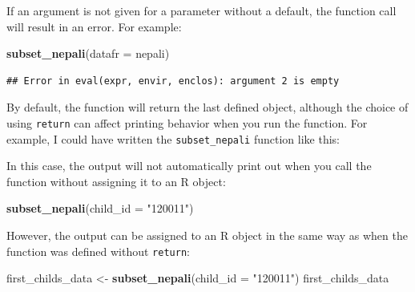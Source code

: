 \documentclass[]{book}
\makeatletter
\newenvironment{Shaded}{\begin{snugshade}}{\end{snugshade}}
\newcommand{\KeywordTok}[1]{\textcolor[rgb]{0.13,0.29,0.53}{\textbf{{#1}}}}
\newcommand{\DataTypeTok}[1]{\textcolor[rgb]{0.13,0.29,0.53}{{#1}}}
\newcommand{\StringTok}[1]{\textcolor[rgb]{0.31,0.60,0.02}{{#1}}}
\newcommand{\NormalTok}[1]{{#1}}
\newenvironment{kframe}{%
\medskip{}
\setlength{\fboxsep}{.8em}
 \def\at@end@of@kframe{}%
 \ifinner\ifhmode%
  \def\at@end@of@kframe{\end{minipage}}%
  \begin{minipage}{\columnwidth}%
 \fi\fi%
 \def\FrameCommand##1{\hskip\@totalleftmargin \hskip-\fboxsep
 \colorbox{shadecolor}{##1}\hskip-\fboxsep
     \hskip-\linewidth \hskip-\@totalleftmargin \hskip\columnwidth}%
 \MakeFramed {\advance\hsize-\width
   \@totalleftmargin\z@ \linewidth\hsize
   \@setminipage}}%
 {\par\unskip\endMakeFramed%
 \at@end@of@kframe}
\renewenvironment{Shaded}{\begin{kframe}}{\end{kframe}}
\makeatother
\begin{document}
If an argument is not given for a parameter without a default, the
function call will result in an error. For example:

\begin{Shaded}
\begin{Highlighting}[]
\KeywordTok{subset_nepali}\NormalTok{(}\DataTypeTok{datafr =} \NormalTok{nepali)}
\end{Highlighting}
\end{Shaded}

\begin{verbatim}
## Error in eval(expr, envir, enclos): argument 2 is empty
\end{verbatim}

By default, the function will return the last defined object, although
the choice of using \texttt{return} can affect printing behavior when
you run the function. For example, I could have written the
\texttt{subset\_nepali} function like this:

\begin{Shaded}
\end{Shaded}

In this case, the output will not automatically print out when you call
the function without assigning it to an R object:

\begin{Shaded}
\begin{Highlighting}[]
\KeywordTok{subset_nepali}\NormalTok{(}\DataTypeTok{child_id =} \StringTok{"120011"}\NormalTok{)}
\end{Highlighting}
\end{Shaded}

However, the output can be assigned to an R object in the same way as
when the function was defined without \texttt{return}:

\begin{Shaded}
\begin{Highlighting}[]
\NormalTok{first_childs_data <-}\StringTok{ }\KeywordTok{subset_nepali}\NormalTok{(}\DataTypeTok{child_id =} \StringTok{"120011"}\NormalTok{)}
\NormalTok{first_childs_data}
\end{Highlighting}
\end{Shaded}
\end{document}

